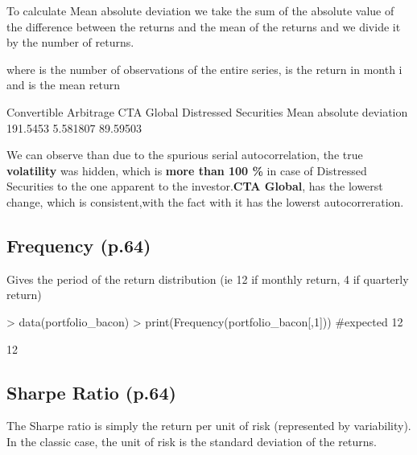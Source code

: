 \documentclass[12pt,letterpaper,english]{article}
\begin{document}
To calculate Mean absolute deviation we take the sum of the absolute value of the difference between the returns and the mean of the returns and we divide it by the number of returns.


where  is the number of observations of the entire series,  is the return in month i and  is the mean return

\begin{Schunk}
\begin{Soutput}
                        Convertible Arbitrage CTA Global Distressed Securities
Mean absolute deviation              191.5453   5.581807              89.59503
\end{Soutput}
\end{Schunk}

We can observe than due to the spurious serial autocorrelation, the true \textbf{volatility} was hidden, which is \textbf{more than 100 \% } in case of Distressed Securities to the one apparent to the investor.\textbf{CTA Global}, has the lowerst change, which is consistent,with the fact with it has the lowerst autocorreration.

\subsection{Frequency (p.64)}

Gives the period of the return distribution (ie 12 if monthly return, 4 if quarterly return)

\begin{Schunk}
\begin{Sinput}
> data(portfolio_bacon)
> print(Frequency(portfolio_bacon[,1])) #expected 12
\end{Sinput}
\begin{Soutput}
[1] 12
\end{Soutput}
\end{Schunk}

\subsection{Sharpe Ratio (p.64)}

The Sharpe ratio is simply the return per unit of risk (represented by variability).  In the classic case, the unit of risk is the standard deviation of the returns.
 
\end{document}
